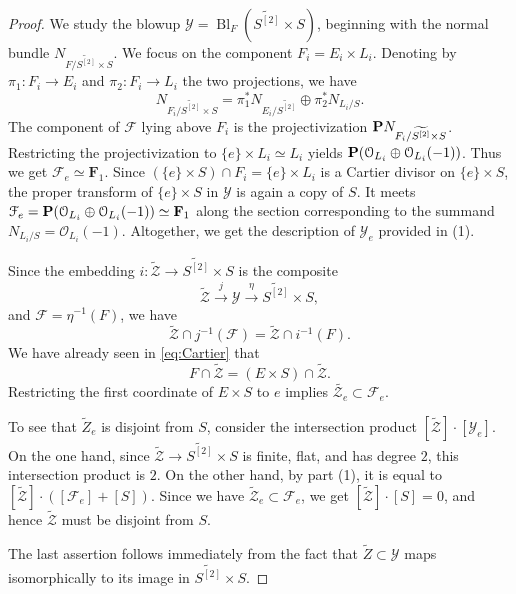\documentclass[12pt,reqno]{amsart}
\DeclareMathOperator{\Bl}{Bl}
\renewcommand{\to}{{\longrightarrow}}
\numberwithin{equation}{section}
\renewcommand{\O}{\mathcal O}
\newcommand{\F}{\mathbf F}
\newcommand{\td}{\widetilde}
\begin{document}
\begin{proof}
  We study the blowup $\mathcal{Y} = \Bl_{F} \left( \td{S^{[2]}} \times S
  \right)$, beginning with the normal bundle $N_{F/ \td{S^{[2]}} \times S }$.
  We focus on the component $F_{i} = E_{i} \times L_{i}$.
  Denoting by ${\pi}_1 \colon F_i \to E_i$ and ${\pi}_2 \colon F_i \to L_i$ the two projections, we have
  \[N_{F_{i}/ \td{S^{[2]}} \times S } = {\pi}_{1}^{*}
    N_{E_{i}/\td{S^{[2]}}} \oplus {\pi}_{2}^{*}N_{L_{i}/S}.\]
  The component of $\mathcal{F}$ lying above $F_{i}$ is the
  projectivization $\P N_{F_{i}/ \td{S^{[2]}} \times S }$.
  Restricting the projectivization to $\{e\} \times L_{i} \simeq L_i$ yields
  $\P (\O_{L_{i}} \oplus \O_{L_{i}}(-1))$.
  Thus we get  $\mathcal{F}_{e} \simeq \F_{1}$.
  Since $(\{e\} \times S) \cap F_{i} = \{e\} \times L_{i}$ is a Cartier
  divisor on $\{e\} \times S$, the proper transform of $\{e\} \times S$ in
  $\mathcal{Y}$ is again a copy of $S$.
  It meets
  $\mathcal{F}_{e} = \P (\O_{L_{i}} \oplus \O_{L_{i}}(-1)) \simeq
  \F_{1}$ along the section corresponding to the summand
  $N_{L_{i}/S} = \O_{L_{i}}(-1)$.
  Altogether, we get the description of $\mathcal{Y}_{e}$ provided in (1).

  Since the embedding $i \colon \widetilde {\mathcal Z} \to \widetilde{S^{[2]}} \times S$ is the composite
  \[\widetilde {\mathcal Z} \xrightarrow{j} \mathcal Y \xrightarrow{\eta} \widetilde{S^{[2]}} \times S,\]
  and $\mathcal F = \eta^{-1}(F)$, we have
  \[ \widetilde {\mathcal Z} \cap j^{-1}\left(\mathcal F\right) = \widetilde {\mathcal Z} \cap i^{-1}(F).\]
  We have already seen in \eqref{eq:Cartier} that
  \[F \cap \td{\mathcal{Z}} = (E \times S)\cap \td{\mathcal{Z}}.\]
  Restricting the first coordinate of $E \times S$ to $e$ implies
  $\td{\mathcal{Z}_{e}} \subset \mathcal{F}_{e}$.

  To see that $\widetilde Z_e$ is disjoint from $S$, consider
the intersection product
$[\td{\mathcal{Z}}] \cdot [\mathcal{Y}_{e}]$.  On the one hand, since
$\td{\mathcal{Z}} \to \td{S^{[2]}} \times S$ is finite,
flat, and has degree $2$, this intersection product is $2$.  On the
other hand, by part (1), it is equal to
$[\td{\mathcal{Z}}] \cdot ([\mathcal{F}_{e}]+ [S])$.
Since we have
$\td{\mathcal{Z}}_{e} \subset \mathcal{F}_{e}$, we get
$[\td{\mathcal{Z}}] \cdot [S] = 0$, and hence $\td{\mathcal Z}$ must be disjoint from $S$.

The last assertion follows immediately from the fact that $\widetilde Z \subset \mathcal Y$ maps isomorphically to its image in $\widetilde{S^{[2]}} \times S$.
\end{proof}
\end{document}
